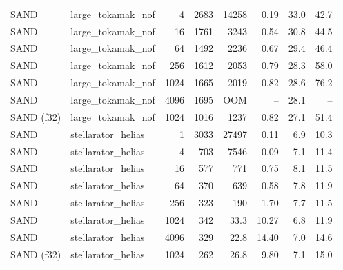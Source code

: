 \begin{tabular}{llrrrrrr}
SAND & large\_tokamak\_nof & 4 & 2683 & 14258 & 0.19 & 33.0 & 42.7 \\
SAND & large\_tokamak\_nof & 16 & 1761 & 3243 & 0.54 & 30.8 & 44.5 \\
SAND & large\_tokamak\_nof & 64 & 1492 & 2236 & 0.67 & 29.4 & 46.4 \\
SAND & large\_tokamak\_nof & 256 & 1612 & 2053 & 0.79 & 28.3 & 58.0 \\
SAND & large\_tokamak\_nof & 1024 & 1665 & 2019 & 0.82 & 28.6 & 76.2 \\
SAND & large\_tokamak\_nof & 4096 & 1695 & OOM & -- & 28.1 & -- \\
SAND (f32) & large\_tokamak\_nof & 1024 & 1016 & 1237 & 0.82 & 27.1 & 51.4 \\
SAND & stellarator\_helias & 1 & 3033 & 27497 & 0.11 & 6.9 & 10.3 \\
SAND & stellarator\_helias & 4 & 703 & 7546 & 0.09 & 7.1 & 11.4 \\
SAND & stellarator\_helias & 16 & 577 & 771 & 0.75 & 8.1 & 11.5 \\
SAND & stellarator\_helias & 64 & 370 & 639 & 0.58 & 7.8 & 11.9 \\
SAND & stellarator\_helias & 256 & 323 & 190 & 1.70 & 7.7 & 11.5 \\
SAND & stellarator\_helias & 1024 & 342 & 33.3 & 10.27 & 6.8 & 11.9 \\
SAND & stellarator\_helias & 4096 & 329 & 22.8 & 14.40 & 7.0 & 14.6 \\
SAND (f32) & stellarator\_helias & 1024 & 262 & 26.8 & 9.80 & 7.1 & 15.0 \\
\bottomrule
\end{tabular}
